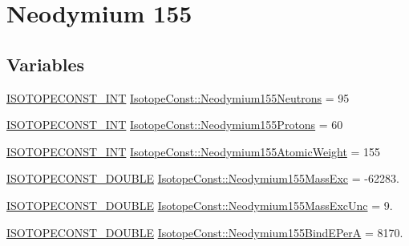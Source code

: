 \hypertarget{group___isotope_const-_neodymium-_nd155}{}\section{Neodymium 155}
\label{group___isotope_const-_neodymium-_nd155}
\subsection*{Variables}
\begin{DoxyCompactItemize}
\item 
\mbox{\hyperlink{group___isotope_const-_macros_ga5f18360b3e99483a35c32d789e62621c}{I\+S\+O\+T\+O\+P\+E\+C\+O\+N\+S\+T\+\_\+\+I\+NT}} \mbox{\hyperlink{group___isotope_const-_neodymium-_nd155_gaee9c50b261495edc17198dd1b78ea5dc}{Isotope\+Const\+::\+Neodymium155\+Neutrons}} = 95
\item 
\mbox{\hyperlink{group___isotope_const-_macros_ga5f18360b3e99483a35c32d789e62621c}{I\+S\+O\+T\+O\+P\+E\+C\+O\+N\+S\+T\+\_\+\+I\+NT}} \mbox{\hyperlink{group___isotope_const-_neodymium-_nd155_gaa6945eef5392a439b5f4a89c3acc2877}{Isotope\+Const\+::\+Neodymium155\+Protons}} = 60
\item 
\mbox{\hyperlink{group___isotope_const-_macros_ga5f18360b3e99483a35c32d789e62621c}{I\+S\+O\+T\+O\+P\+E\+C\+O\+N\+S\+T\+\_\+\+I\+NT}} \mbox{\hyperlink{group___isotope_const-_neodymium-_nd155_ga685e4e812e3f5e49de0dabec890e9cb9}{Isotope\+Const\+::\+Neodymium155\+Atomic\+Weight}} = 155
\item 
\mbox{\hyperlink{group___isotope_const-_macros_ga8f45a7272ce02c0b4c65c44636ed719a}{I\+S\+O\+T\+O\+P\+E\+C\+O\+N\+S\+T\+\_\+\+D\+O\+U\+B\+LE}} \mbox{\hyperlink{group___isotope_const-_neodymium-_nd155_ga306d8b887579a00f3a9a91f344709069}{Isotope\+Const\+::\+Neodymium155\+Mass\+Exc}} = -\/62283.
\item 
\mbox{\hyperlink{group___isotope_const-_macros_ga8f45a7272ce02c0b4c65c44636ed719a}{I\+S\+O\+T\+O\+P\+E\+C\+O\+N\+S\+T\+\_\+\+D\+O\+U\+B\+LE}} \mbox{\hyperlink{group___isotope_const-_neodymium-_nd155_gaa559079c1c912903687fdee3697ebd5b}{Isotope\+Const\+::\+Neodymium155\+Mass\+Exc\+Unc}} = 9.
\item 
\mbox{\hyperlink{group___isotope_const-_macros_ga8f45a7272ce02c0b4c65c44636ed719a}{I\+S\+O\+T\+O\+P\+E\+C\+O\+N\+S\+T\+\_\+\+D\+O\+U\+B\+LE}} \mbox{\hyperlink{group___isotope_const-_neodymium-_nd155_ga9ffa27e9ea73a1ad99f921c068437e2a}{Isotope\+Const\+::\+Neodymium155\+Bind\+E\+PerA}} = 8170.
\item 

\end{DoxyCompactItemize}
